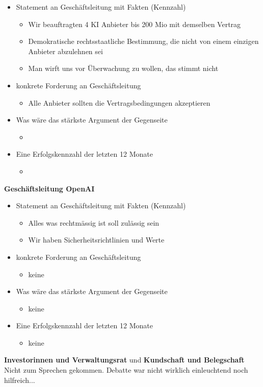 \begin{itemize}
    \item Statement an Geschäftsleitung mit Fakten (Kennzahl)
          \begin{itemize}
              \item Wir beauftragten 4 KI Anbieter bis 200 Mio mit demselben Vertrag
              \item Demokratische rechtsstaatliche Bestimmung, die nicht von einem einzigen Anbieter abzulehnen sei
              \item Man wirft uns vor Überwachung zu wollen, das stimmt nicht
          \end{itemize}
    \item konkrete Forderung an Geschäftsleitung
          \begin{itemize}
              \item Alle Anbieter sollten die Vertragsbedingungen akzeptieren 
          \end{itemize}
    \item Was wäre das stärkste Argument der Gegenseite
          \begin{itemize}
              \item
          \end{itemize}
    \item Eine Erfolgskennzahl der letzten 12 Monate
          \begin{itemize}
              \item
          \end{itemize}
\end{itemize}

\textbf{Geschäftsleitung OpenAI}
\begin{itemize}
    \item Statement an Geschäftsleitung mit Fakten (Kennzahl) 
    \begin{itemize}
        \item Alles was rechtmässig ist soll zulässig sein
        \item Wir haben Sicherheitsrichtlinien und Werte
    \end{itemize}
    \item konkrete Forderung an Geschäftsleitung
    \begin{itemize}
        \item keine
    \end{itemize}
    \item Was wäre das stärkste Argument der Gegenseite
    \begin{itemize}
        \item keine
    \end{itemize}
    \item Eine Erfolgskennzahl der letzten 12 Monate
    \begin{itemize}
        \item keine
    \end{itemize}
\end{itemize}
\textbf{Investorinnen und Verwaltungsrat} und
\textbf{Kundschaft und Belegschaft}
Nicht zum Sprechen gekommen. Debatte war nicht wirklich einleuchtend noch hilfreich... 


